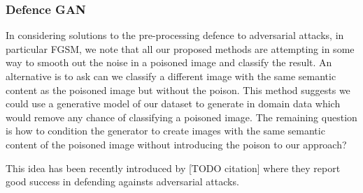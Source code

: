\subsubsection{Defence GAN}
In considering solutions to the pre-processing defence to adversarial attacks, in particular FGSM, we note that all our proposed methods are attempting in some way to smooth out the noise in a poisoned image and classify the result. An alternative is to ask can we classify a different image with the same semantic content as the poisoned image but without the poison.  This method suggests we could use a generative model of our dataset to generate in domain data which would remove any chance of classifying a poisoned image.  The remaining question is how to condition the generator to create images with the same semantic content of the poisoned image without introducing the poison to our approach?

This idea has been recently introduced by [TODO citation] where they report good success in defending againsts adversarial attacks.

